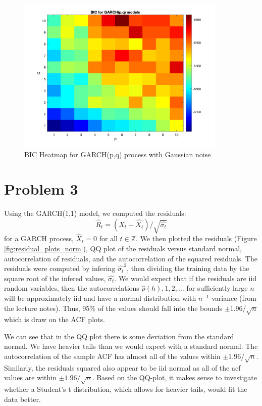 \documentclass{article}
\begin{document}
\begin{figure}[H]
\includegraphics[width=10cm]{plots/bic_heatmap_norm.png}
\centering
\caption{BIC Heatmap for GARCH(p,q) process with Gaussian noise}
\label{fig:bic_heatmap_norm}
\end{figure}

\section*{Problem 3}

Using the GARCH(1,1) model, we computed the residuals:
$$
\hat{R}_t = (X_t - \hat{X_t})/\sqrt{\hat{\sigma_t}}
$$
for a GARCH process, $\hat{X}_t = 0$ for all $t \in \mathbb Z$.
We then plotted the residuals (Figure \ref{fig:residual_plots_norm}), QQ plot of the residuals versus standard normal, autocorrelation of residuals, and the autocorrelation of the squared residuals.
The residuals were computed by infering $\hat{\sigma_t}^2$, then dividing the training data by the square root of the infered values, $\hat{\sigma_t}$.
We would expect that if the residuals are iid random variables, then the autocorrelations $\hat{\rho}(h), 1,2,\ldots$ for sufficiently large $n$ will be approximately iid and have a normal distribution with $n^{-1}$ variance (from the lecture notes).
Thus, 95\% of the values should fall into the bounds $\pm 1.96 / \sqrt{n}$ which is draw on the ACF plots.

We can see that in the QQ plot there is some deviation from the standard normal.
We have heavier tails than we would expect with a standard normal.
The autocorrelation of the sample ACF has almost all of the values within $\pm 1.96 / \sqrt{n}$.
Similarly, the residuals squared also appear to be iid normal as all of the acf values are within $\pm 1.96 / \sqrt{n}$.
Based on the QQ-plot, it makes sense to investigate whether a Student's t distribution, which allows for heavier tails, would fit the data better.
\end{document}
